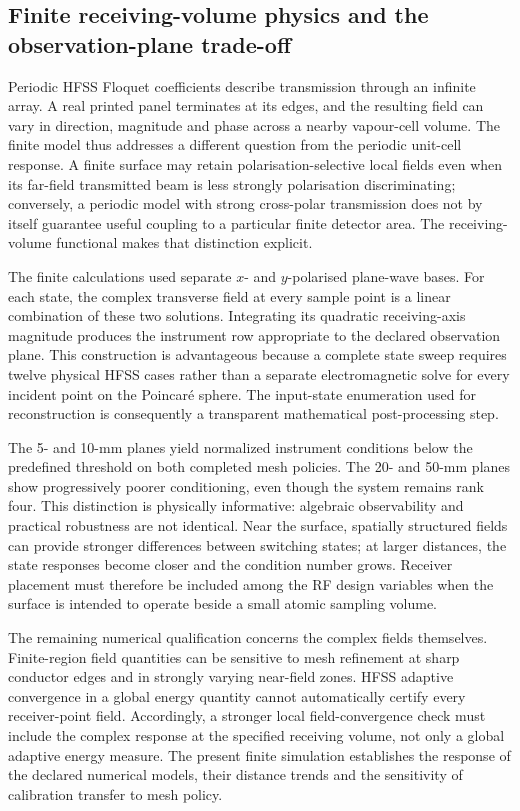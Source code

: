 \documentclass{ieeeaccess}
\begin{document}
\subsection{Finite receiving-volume physics and the observation-plane trade-off}
Periodic HFSS Floquet coefficients describe transmission through an infinite array. A real printed panel terminates at its edges, and the resulting field can vary in direction, magnitude and phase across a nearby vapour-cell volume. The finite model thus addresses a different question from the periodic unit-cell response. A finite surface may retain polarisation-selective local fields even when its far-field transmitted beam is less strongly polarisation discriminating; conversely, a periodic model with strong cross-polar transmission does not by itself guarantee useful coupling to a particular finite detector area. The receiving-volume functional makes that distinction explicit.

The finite calculations used separate $x$- and $y$-polarised plane-wave bases. For each state, the complex transverse field at every sample point is a linear combination of these two solutions. Integrating its quadratic receiving-axis magnitude produces the instrument row appropriate to the declared observation plane. This construction is advantageous because a complete state sweep requires twelve physical HFSS cases rather than a separate electromagnetic solve for every incident point on the Poincar\'e sphere. The input-state enumeration used for reconstruction is consequently a transparent mathematical post-processing step.

The 5- and 10-mm planes yield normalized instrument conditions below the predefined threshold on both completed mesh policies. The 20- and 50-mm planes show progressively poorer conditioning, even though the system remains rank four. This distinction is physically informative: algebraic observability and practical robustness are not identical. Near the surface, spatially structured fields can provide stronger differences between switching states; at larger distances, the state responses become closer and the condition number grows. Receiver placement must therefore be included among the RF design variables when the surface is intended to operate beside a small atomic sampling volume.

The remaining numerical qualification concerns the complex fields themselves. Finite-region field quantities can be sensitive to mesh refinement at sharp conductor edges and in strongly varying near-field zones. HFSS adaptive convergence in a global energy quantity cannot automatically certify every receiver-point field. Accordingly, a stronger local field-convergence check must include the complex response at the specified receiving volume, not only a global adaptive energy measure. The present finite simulation establishes the response of the declared numerical models, their distance trends and the sensitivity of calibration transfer to mesh policy.
\end{document}
